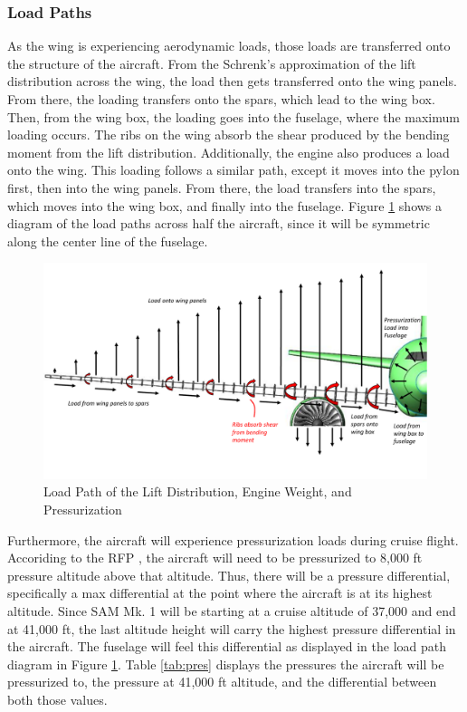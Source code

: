 \subsubsection{Load Paths}
As the wing is experiencing aerodynamic loads, those loads are transferred onto the structure of the aircraft. From the Schrenk's approximation of the lift distribution across the wing, the load then gets transferred onto the wing panels. From there, the loading transfers onto the spars, which lead to the wing box. Then, from the wing box, the loading goes into the fuselage, where the maximum loading occurs. The ribs on the wing absorb the shear produced by the bending moment from the lift distribution. Additionally, the engine also produces a load onto the wing. This loading follows a similar path, except it moves into the pylon first, then into the wing panels. From there, the load transfers into the spars, which moves into the wing box, and finally into the fuselage. Figure \ref{loadpath} shows a diagram of the load paths across half the aircraft, since it will be symmetric along the center line of the fuselage. 

\begin{figure}[H]
    \centering
    \includegraphics[width=1.0\linewidth]{Photos/Load_Path.pdf}
    \caption{Load Path of the Lift Distribution, Engine Weight, and Pressurization}
    \label{loadpath}
\end{figure}

\newpage
Furthermore, the aircraft will experience pressurization loads during cruise flight. Accoriding to the RFP \cite{RFP}, the aircraft will need to be pressurized to 8,000 ft pressure altitude above that altitude. Thus, there will be a pressure differential, specifically a max differential at the point where the aircraft is at its highest altitude. Since SAM Mk. 1 will be starting at a cruise altitude of 37,000 and end at 41,000 ft, the last altitude height will carry the highest pressure differential in the aircraft. The fuselage will feel this differential as displayed in the load path diagram in Figure \ref{loadpath}.
Table \ref{tab:pres} displays the pressures the aircraft will be pressurized to, the pressure at 41,000 ft altitude, and the differential between both those values. 

